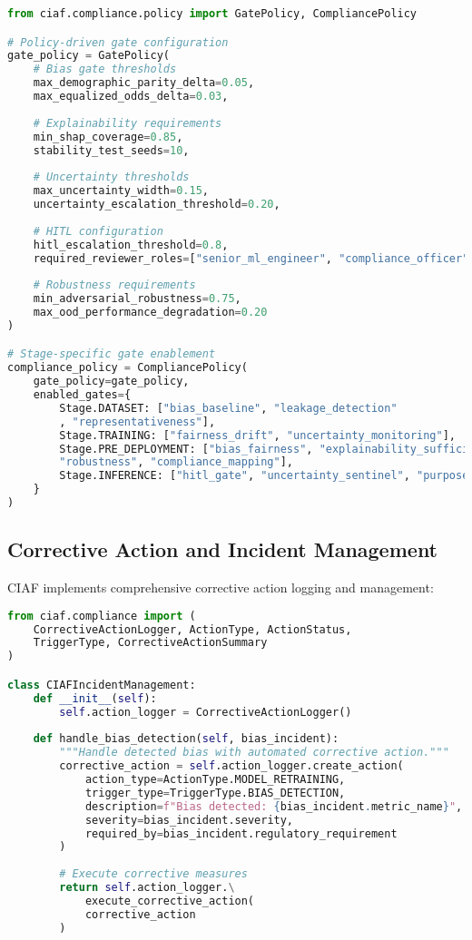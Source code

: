 \documentclass[12pt,a4paper]{article}
\begin{document}
\begin{lstlisting}[language=Python, caption=Gate Policy Configuration]
from ciaf.compliance.policy import GatePolicy, CompliancePolicy

# Policy-driven gate configuration
gate_policy = GatePolicy(
    # Bias gate thresholds
    max_demographic_parity_delta=0.05,
    max_equalized_odds_delta=0.03,
    
    # Explainability requirements
    min_shap_coverage=0.85,
    stability_test_seeds=10,
    
    # Uncertainty thresholds
    max_uncertainty_width=0.15,
    uncertainty_escalation_threshold=0.20,
    
    # HITL configuration
    hitl_escalation_threshold=0.8,
    required_reviewer_roles=["senior_ml_engineer", "compliance_officer"],
    
    # Robustness requirements
    min_adversarial_robustness=0.75,
    max_ood_performance_degradation=0.20
)

# Stage-specific gate enablement
compliance_policy = CompliancePolicy(
    gate_policy=gate_policy,
    enabled_gates={
        Stage.DATASET: ["bias_baseline", "leakage_detection"
        , "representativeness"],
        Stage.TRAINING: ["fairness_drift", "uncertainty_monitoring"],
        Stage.PRE_DEPLOYMENT: ["bias_fairness", "explainability_sufficiency", 
        "robustness", "compliance_mapping"],
        Stage.INFERENCE: ["hitl_gate", "uncertainty_sentinel", "purpose_binding"]
    }
)
\end{lstlisting}

\subsection{Corrective Action and Incident Management}

CIAF implements comprehensive corrective action logging and management:

\begin{lstlisting}[language=Python, caption=Corrective Action System]
from ciaf.compliance import (
    CorrectiveActionLogger, ActionType, ActionStatus,
    TriggerType, CorrectiveActionSummary
)

class CIAFIncidentManagement:
    def __init__(self):
        self.action_logger = CorrectiveActionLogger()
    
    def handle_bias_detection(self, bias_incident):
        """Handle detected bias with automated corrective action."""
        corrective_action = self.action_logger.create_action(
            action_type=ActionType.MODEL_RETRAINING,
            trigger_type=TriggerType.BIAS_DETECTION,
            description=f"Bias detected: {bias_incident.metric_name}",
            severity=bias_incident.severity,
            required_by=bias_incident.regulatory_requirement
        )
        
        # Execute corrective measures
        return self.action_logger.\
            execute_corrective_action(
            corrective_action
        )
\end{lstlisting}
\end{document}
